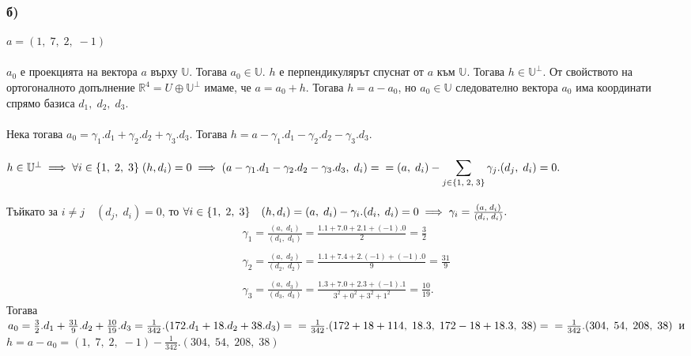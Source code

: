 \documentclass[a4paper, 12pt]{article}
\begin{document}
    \subsubsection*{б)}
    $a = (1, \; 7, \; 2, \; -1)$ \\\\
    $a_0$ е проекцията на вектора $a$ върху $\mathbb{U}$.
    Тогава $a_0 \in \mathbb{U}$. $h$ е перпендикулярът спуснат от $a$ към $\mathbb{U}$.
    Тогава $h \in \mathbb{U}^\perp$. От свойството на ортогоналното допълнение
    $\mathbb{R}^4 = U \oplus \mathbb{U}^\perp$ имаме, че $a = a_0 + h$.
    Тогава $h = a - a_0$, но $a_0 \in \mathbb{U}$ следователно вектора
    $a_0$ има координати спрямо базиса $d_1, \; d_2, \; d_3$. \\\\
    Нека тогава $a_0 = \gamma_1.d_1 + \gamma_2.d_2 + \gamma_3.d_3$.
    Тогава $h = a - \gamma_1.d_1 - \gamma_2.d_2 - \gamma_3.d_3$. \\\\
    $h \in \mathbb{U}^\perp \implies \forall i \in \{1, \; 2, \; 3\} \; (h, d_i) = 0
    \implies (a - \gamma_1.d_1 - \gamma_2.d_2 - \gamma_3.d_3, \; d_i) = \\\\
    = (a, \; d_i) - \displaystyle\sum_{j \in \{1, \; 2, \; 3\}} \gamma_j.(d_j, \; d_i) = 0.$ \\\\
    Тъйкато за $i \neq j \quad (d_j, \; d_i) = 0$, то
    $\forall i \in \{1, \; 2, \; 3\} \quad (h, d_i) = (a, \; d_i) - \gamma_i.(d_i, \; d_i) = 0 \\\\
    \implies \gamma_i = \frac{(a, \; d_i)}{(d_i, \; d_i)}.$
    \begin{align*}
        \gamma_1 = \frac{(a, \; d_1)}{(d_1, \; d_1)} = \frac{1.1 + 7.0 + 2.1 + (-1).0}{2} = \frac{3}{2} \\\\
        \gamma_2 = \frac{(a, \; d_2)}{(d_2, \; d_2)} = \frac{1.1 + 7.4 + 2.(-1) + (-1).0}{9} = \frac{31}{9} \\\\
        \gamma_3 = \frac{(a, \; d_3)}{(d_3, \; d_3)} = \frac{1.3 + 7.0 + 2.3 + (-1).1}{3^2 + 0^2 + 3^2 + 1^2} = \frac{10}{19}.
    \end{align*}
    Тогава $a_0 = \frac{3}{2}.d_1 + \frac{31}{9}.d_2 + \frac{10}{19}.d_3 
    = \frac{1}{342}.(172.d_1 + 18.d_2 + 38.d_3) = \\\\
    = \frac{1}{342}.(172 + 18 + 114, \; 18.3, \; 172 - 18 + 18.3, \; 38) = \\\\
    = \frac{1}{342}.(304, \; 54, \; 208, \; 38)$ и $h = a - a_0 = (1, \; 7, \; 2, \; -1) - \frac{1}{342}.(304, \; 54, \; 208, \; 38)$ 
\end{document}
